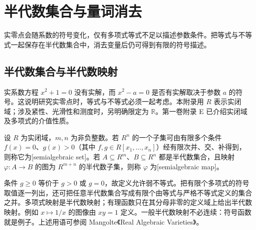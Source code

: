 
\section{半代数集合与量词消去}
\label{b3:sec:G01}

实零点会随系数的符号变化，仅有多项式等式不足以描述参数条件。把等式与不等式一起保存在半代数集合中，消去变量后仍可得到有限的符号描述。


\subsection{半代数集合与半代数映射}
\label{b3:subsec:G01:01}

实系数方程 \(x^2+1=0\) 没有实解，而 \(x^2-a=0\) 是否有实解取决于参数 \(a\) 的符号。这说明研究实零点时，等式与不等式必须一起考虑。本附录用 \(R\) 表示实闭域；涉及紧性、光滑性和测度时，另明确限定为 \(\mathbb R\)。第一卷附录 E 已介绍实闭域及多项式的介值性质。

\begin{definition}\label{b3:def:semialgebraic-set}
	设 \(R\) 为实闭域，\(m,n\) 为非负整数。若 \(R^n\) 的一个子集可由有限多个条件 \(f(x)=0\)、\(g(x)>0\)（其中 \(f,g\in R[x_1,\ldots,x_n]\)）经有限次并、交、补得到，则称它为[semialgebraic set]。若 \(A\subseteq R^m\)、\(B\subseteq R^n\) 都是半代数集合，且映射 \(\varphi:A\to B\) 的图为 \(R^{m+n}\) 的半代数子集，则称 \(\varphi\) 为[semialgebraic map]。
\end{definition}

条件 \(g\ge0\) 等价于 \(g>0\) 或 \(g=0\)，故定义允许弱不等式。把有限个多项式的符号取值逐一列出，还可把任意半代数集合写成有限个由等式与严格不等式定义的集合之并。多项式映射是半代数映射；有理函数只在其分母非零的定义域上给出半代数映射。例如 \(x\mapsto1/x\) 的图像由 \(xy=1\) 定义。一般半代数映射不必连续：符号函数就是例子。上述用语可参阅 Mangolte《Real Algebraic Varieties》\cite[Appendix B, Definitions B.2.1--B.2.2]{Mangolte2020RealAlgebraicVarieties}。

